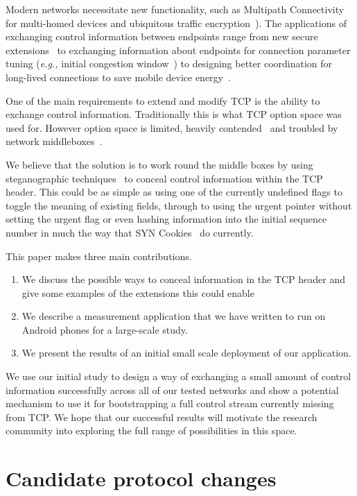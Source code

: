 \documentclass{sig-alternate-10pt}
\providecommand{\eg}{\emph{e.g.,} }
\begin{document}
Modern networks necessitate new functionality, such as Multipath Connectivity~\cite{Handley:vj} for multi-homed devices and ubiquitous traffic encryption~\cite{Mazieres:uz}). The applications of exchanging control information between endpoints range from new secure extensions~\cite{Rescorla:R080FoGB} to exchanging information about endpoints for connection parameter tuning (\eg initial congestion window~\cite{Dukkipati:2010hs}) to designing better coordination for long-lived connections to save mobile device energy~\cite{Aucinas:2013uk}.

One of the main requirements to extend and modify TCP is the ability to exchange control information. Traditionally this is what TCP option space was used for. However option space is limited, heavily contended~\cite{Handley:vj,Mazieres:uz} and troubled by network middleboxes~\cite{Honda,Guha2005tb,UntoldMiddlebox2011}.

We believe that the solution is to work round the middle boxes by using steganographic techniques~\cite{Frczek:2012dl,Zielinska:2014fn,Rowland:1997vq,Murdoch:2005fz} to conceal control information within the TCP header. This could be as simple as using one of the currently undefined flags to toggle the meaning of existing fields, through to using the urgent pointer without setting the urgent flag or even hashing information into the initial sequence number in much the way that SYN Cookies~\cite{Eddy:2007to} do currently.

This paper makes three main contributions. 
\begin{enumerate}
\item We discuss the possible ways to conceal information in the TCP header and give some examples of the extensions this could enable
\item We describe a measurement application that we have written to run on Android phones for a large-scale study.  
\item We present the results of an initial small scale deployment of our application.
\end{enumerate}

We use our initial study to design a way of exchanging a small amount of control information successfully across all of our tested networks and show a potential mechanism to use it for bootstrapping a full control stream currently missing from TCP. We hope that our successful results will motivate the research community into exploring the full range of possibilities in this space.

\section{Candidate protocol changes}
\label{sec:protocolChanges}
\end{document}

